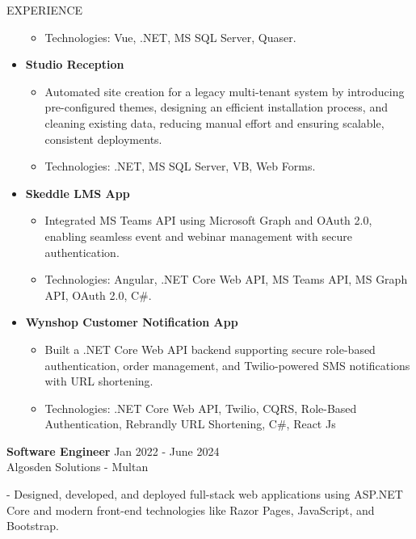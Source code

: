 \documentclass{resume} %
\begin{document}
\begin{rSection}{EXPERIENCE}
\begin{itemize}
\begin{itemize}
				\item Technologies: Vue, .NET, MS SQL Server, Quaser.
			\end{itemize}
			\item \textbf {Studio Reception} 
			\begin{itemize}
				\itemsep -5pt {} 
				\item Automated site creation for a legacy multi-tenant system by introducing pre-configured themes, 
				designing an efficient installation process, and cleaning existing data, reducing manual effort and ensuring scalable, consistent deployments. 
				\item Technologies: .NET, MS SQL Server, VB, Web Forms.
			\end{itemize}
			\item \textbf {Skeddle LMS App} 
			\begin{itemize}
				\itemsep -5pt {}
				\item Integrated MS Teams API using Microsoft Graph and OAuth 2.0, enabling seamless event and webinar management with secure authentication.
				\item Technologies: Angular, .NET Core Web API, MS Teams API, MS Graph API, OAuth 2.0, C\#.
			\end{itemize}
			\item \textbf {Wynshop Customer Notification App} 
			\begin{itemize}
				\itemsep -5pt {} 
				\item Built a .NET Core Web API backend supporting secure role-based authentication, order management, and Twilio-powered SMS notifications with URL shortening.
				\item Technologies: .NET Core Web API, Twilio, CQRS, Role-Based Authentication, Rebrandly URL Shortening, C\#, React Js
			\end{itemize}
			
		\end{itemize}
		
	
	\textbf{Software Engineer} \hfill Jan 2022 - June 2024\\
	Algosden Solutions - Multan %
		\itemsep 1pt {} 
		\item - Designed, developed, and deployed full-stack web applications using ASP.NET Core and modern front-end technologies like Razor Pages, JavaScript, and Bootstrap. 
		

\end{rSection}
\end{document}
